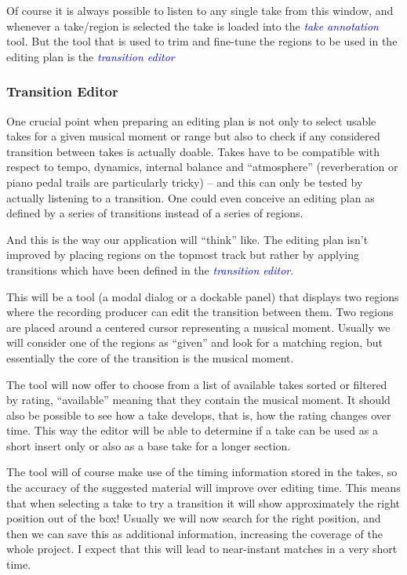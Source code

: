 \documentclass[11pt,a4paper]{article}
\newcommand*{\term}[1]{\textcolor{blue}{\emph{#1}}}
\begin{document}
Of course it is always possible to listen to any single take from this window,
and whenever a take/region is selected the take is loaded into the \term{take
annotation} tool.
But the tool that is used to trim and fine-tune the regions to be used in the
editing plan is the \term{transition editor}

\subsubsection{Transition Editor}

One crucial point when preparing an editing plan is not only to select usable
takes for a given musical moment or range but also to check if any considered
transition between takes is actually doable.
Takes have to be compatible with respect to tempo, dynamics, internal balance
and “atmosphere” (reverberation or piano pedal trails are particularly tricky)
-- and this can only be tested by actually listening to a transition.
One could even conceive an editing plan as defined by a series of transitions
instead of a series of regions.

And this is the way our application will “think” like.
The editing plan isn't improved by placing regions on the topmost track but
rather by applying transitions which have been defined in the \term{transition
editor}.

This will be a tool (a modal dialog or a dockable panel) that displays two
regions where the recording producer can edit the transition between them.
Two regions are placed around a centered cursor representing a musical moment.
Usually we will consider one of the regions as “given” and look for a matching
region, but essentially the core of the transition is the musical moment.

The tool will now offer to choose from a list of available takes sorted or filtered
by rating, “available” meaning that they contain the musical moment.
It should also be possible to see how a take develops, that is, how the rating
changes over time.
This way the editor will be able to determine if a take can be used as a short
insert only or also as a base take for a longer section.

The tool will of course make use of the timing information stored in the takes,
so the accuracy of the suggested material will improve over editing time.
This means that when selecting a take to try a transition it will show
approximately the right position out of the box!
Usually we will now search for the right position, and then we can save this as
additional information, increasing the coverage of the whole project.
I expect that this will lead to near-instant matches in a very short time.
\end{document}
